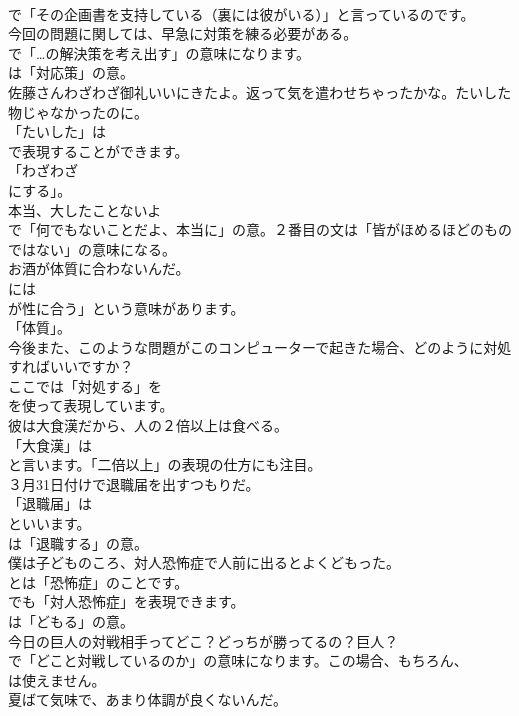 \documentclass[8pt]{extreport}
\begin{document}
\begin{CJK}{UTF8}{min}
\\	で「その企画書を支持している（裏には彼がいる）」と言っているのです。	
\\	今回の問題に関しては、早急に対策を練る必要がある。 
\\	で「…の解決策を考え出す」の意味になります。
\\	は「対応策」の意。	
\\	佐藤さんわざわざ御礼いいにきたよ。返って気を遣わせちゃったかな。たいした物じゃなかったのに。 
\\	「たいした」は
\\	で表現することができます。
\\	「わざわざ 
\\	にする」。	
\\	本当、大したことないよ 
\\	で「何でもないことだよ、本当に」の意。２番目の文は「皆がほめるほどのものではない」の意味になる。	
\\	お酒が体質に合わないんだ。 
\\	には
\\	が性に合う」という意味があります。
\\	「体質」。	
\\	今後また、このような問題がこのコンピューターで起きた場合、どのように対処すればいいですか？ 
\\	ここでは「対処する」を 
\\	を使って表現しています。	
\\	彼は大食漢だから、人の２倍以上は食べる。 
\\	「大食漢」は
\\	と言います。「二倍以上」の表現の仕方にも注目。	
\\	３月31日付けで退職届を出すつもりだ。 
\\	「退職届」は
\\	といいます。
\\	は「退職する」の意。	
\\	僕は子どものころ、対人恐怖症で人前に出るとよくどもった。 
\\	とは「恐怖症」のことです。
\\	でも「対人恐怖症」を表現できます。
\\	は「どもる」の意。	
\\	今日の巨人の対戦相手ってどこ？どっちが勝ってるの？巨人？ 
\\	で「どこと対戦しているのか」の意味になります。この場合、もちろん、
\\	は使えません。	
\\	夏ばて気味で、あまり体調が良くないんだ。 

\end{CJK}
\end{document}
